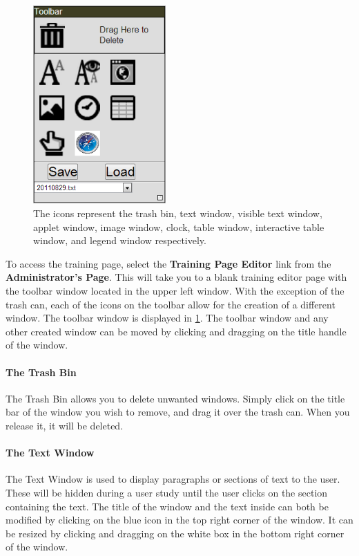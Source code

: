 \documentclass[article]{ij4uq}              %
\begin{document}
\begin{figure}[h!]
 \centering
 \includegraphics[width=2.0in]{figures/toolbar.png}
 \caption{The icons represent the trash bin, text window, visible text window, applet window, image window, clock, table window, interactive table window, and legend window respectively.}
 \label{fig:tool}
\end{figure}
\FloatBarrier

To access the training page, select the \textbf{Training Page Editor} link from the \textbf{Administrator's Page}. This will take you to a blank training editor page with the toolbar window located in the upper left window. With the exception of the trash can, each of the icons on the toolbar allow for the creation of a different window. The toolbar window is displayed in \ref{fig:tool}. The toolbar window and any other created window can be moved by clicking and dragging on the title handle of the window.

\paragraph{The Trash Bin}

The Trash Bin allows you to delete unwanted windows. Simply click on the title bar of the window you wish to remove, and drag it over the trash can. When you release it, it will be deleted.

\paragraph{The Text Window}
The Text Window is used to display paragraphs or sections of text to the user. These will be hidden during a user study until the user clicks on the section containing the text. The title of the window and the text inside can both be modified by clicking on the blue icon in the top right corner of the window. It can be resized by clicking and dragging on the white box in the bottom right corner of the window.
\end{document}
